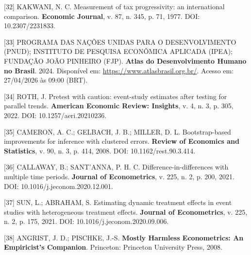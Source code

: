 \documentclass[12pt,a4paper,oneside]{article}
\begin{document}
\begin{singlespace}
\noindent\hangindent=1.25cm\label{ref:kakwani}
[32] KAKWANI, N. C. Measurement of tax progressivity: an
international comparison. \textbf{Economic Journal}, v. 87, n. 345,
p. 71, 1977. DOI: 10.2307/2231833.
\par\smallskip

\noindent\hangindent=1.25cm\label{ref:atlas}
[33] PROGRAMA DAS NAÇÕES UNIDAS PARA O DESENVOLVIMENTO (PNUD);
INSTITUTO DE PESQUISA ECONÔMICA APLICADA (IPEA); FUNDAÇÃO JOÃO
PINHEIRO (FJP). \textbf{Atlas do Desenvolvimento Humano no Brasil}.
2024. Disponível em: \url{https://www.atlasbrasil.org.br/}.
Acesso em: 27/04/2026 às 09:00 (BRT).
\par\smallskip

\noindent\hangindent=1.25cm\label{ref:roth}
[34] ROTH, J. Pretest with caution: event-study estimates after
testing for parallel trends. \textbf{American Economic Review:
Insights}, v. 4, n. 3, p. 305, 2022. DOI:
10.1257/aeri.20210236.
\par\smallskip

\noindent\hangindent=1.25cm\label{ref:cameron}
[35] CAMERON, A. C.; GELBACH, J. B.; MILLER, D. L. Bootstrap-based
improvements for inference with clustered errors. \textbf{Review of
Economics and Statistics}, v. 90, n. 3, p. 414, 2008.
DOI: 10.1162/rest.90.3.414.
\par\smallskip

\noindent\hangindent=1.25cm\label{ref:cs}
[36] CALLAWAY, B.; SANT'ANNA, P. H. C. Difference-in-differences
with multiple time periods. \textbf{Journal of Econometrics},
v. 225, n. 2, p. 200, 2021. DOI:
10.1016/j.jeconom.2020.12.001.
\par\smallskip

\noindent\hangindent=1.25cm\label{ref:sa}
[37] SUN, L.; ABRAHAM, S. Estimating dynamic treatment effects in
event studies with heterogeneous treatment effects. \textbf{Journal
of Econometrics}, v. 225, n. 2, p. 175, 2021. DOI:
10.1016/j.jeconom.2020.09.006.
\par\smallskip

\noindent\hangindent=1.25cm\label{ref:angrist}
[38] ANGRIST, J. D.; PISCHKE, J.-S. \textbf{Mostly Harmless
Econometrics: An Empiricist's Companion}. Princeton: Princeton
University Press, 2008.
\par\smallskip


\end{singlespace}
\end{document}
